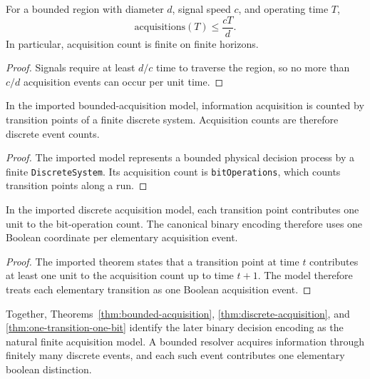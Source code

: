 \begin{theorem}\label{thm:bounded-acquisition}
For a bounded region with diameter $d$, signal speed $c$, and operating time $T$,
\[
\mathrm{acquisitions}(T) \le \frac{cT}{d}.
\]
In particular, acquisition count is finite on finite horizons.
\end{theorem}

\begin{proof}
Signals require at least $d/c$ time to traverse the region, so no more than $c/d$ acquisition events can occur per unit time.
\end{proof}

\begin{theorem}\label{thm:discrete-acquisition}
In the imported bounded-acquisition model, information acquisition is counted by transition points of a finite discrete system. Acquisition counts are therefore discrete event counts.
\end{theorem}

\begin{proof}
The imported model represents a bounded physical decision process by a finite \texttt{DiscreteSystem}. Its acquisition count is \texttt{bitOperations}, which counts transition points along a run.
\end{proof}

\begin{theorem}\label{thm:one-transition-one-bit}
In the imported discrete acquisition model, each transition point contributes one unit to the bit-operation count. The canonical binary encoding therefore uses one Boolean coordinate per elementary acquisition event.
\end{theorem}

\begin{proof}
The imported theorem states that a transition point at time $t$ contributes at least one unit to the acquisition count up to time $t+1$. The model therefore treats each elementary transition as one Boolean acquisition event.
\end{proof}

Together, Theorems~\ref{thm:bounded-acquisition}, \ref{thm:discrete-acquisition}, and \ref{thm:one-transition-one-bit} identify the later binary decision encoding as the natural finite acquisition model. A bounded resolver acquires information through finitely many discrete events, and each such event contributes one elementary boolean distinction.


